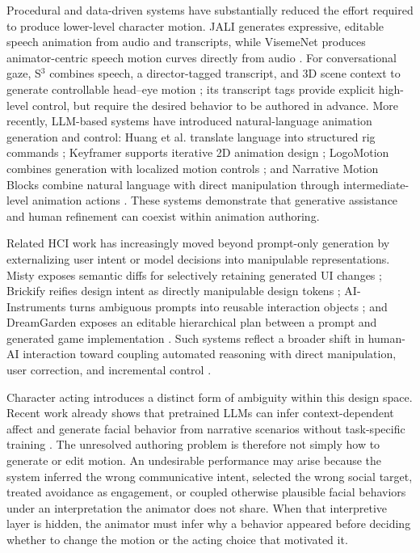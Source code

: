 Procedural and data-driven systems have substantially reduced the effort required to produce lower-level character motion. JALI generates expressive, editable speech animation from audio and transcripts, while VisemeNet produces animator-centric speech motion curves directly from audio \cite{edwards2016jali,zhou2018visemenet}. For conversational gaze, S$^3$ combines speech, a director-tagged transcript, and 3D scene context to generate controllable head--eye motion \cite{pan2024s3}; its transcript tags provide explicit high-level control, but require the desired behavior to be authored in advance. More recently, LLM-based systems have introduced natural-language animation generation and control: Huang et al. translate language into structured rig commands \cite{huang2023realtime}; Keyframer supports iterative 2D animation design \cite{tseng2025keyframer}; LogoMotion combines generation with localized motion controls \cite{liu2025logomotion}; and Narrative Motion Blocks combine natural language with direct manipulation through intermediate-level animation actions \cite{bourgault2025narrative}. These systems demonstrate that generative assistance and human refinement can coexist within animation authoring.

Related HCI work has increasingly moved beyond prompt-only generation by externalizing user intent or model decisions into manipulable representations. Misty exposes semantic diffs for selectively retaining generated UI changes \cite{lu2025misty}; Brickify reifies design intent as directly manipulable design tokens \cite{shi2025brickify}; AI-Instruments turns ambiguous prompts into reusable interaction objects \cite{riche2025ai}; and DreamGarden exposes an editable hierarchical plan between a prompt and generated game implementation \cite{earle2025dreamgarden}. Such systems reflect a broader shift in human-AI interaction toward coupling automated reasoning with direct manipulation, user correction, and incremental control \cite{horvitz1999mixed,amershi2019guidelines}.

Character acting introduces a distinct form of ambiguity within this design space. Recent work already shows that pretrained LLMs can infer context-dependent affect and generate facial behavior from narrative scenarios without task-specific training \cite{durupinar2025prompt}. The unresolved authoring problem is therefore not simply how to generate or edit motion. An undesirable performance may arise because the system inferred the wrong communicative intent, selected the wrong social target, treated avoidance as engagement, or coupled otherwise plausible facial behaviors under an interpretation the animator does not share. When that interpretive layer is hidden, the animator must infer why a behavior appeared before deciding whether to change the motion or the acting choice that motivated it.

